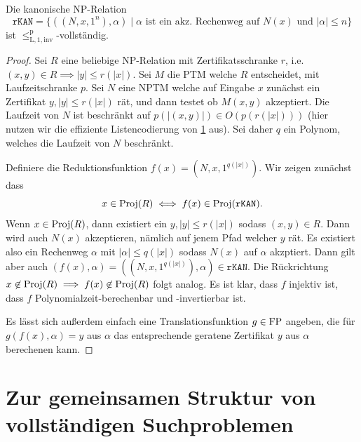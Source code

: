 \begin{theorem}
    Die kanonische NP-Relation
    \[ \mathtt{rKAN} = \{ ((N,x,1^n), \alpha) \mid \text{$\alpha$ ist ein akz. Rechenweg auf $N(x)$ und $|\alpha|\leq n$} \} \]
    ist $\leq_\mathrm{L,1,inv}^\mathrm p$-vollständig.
\end{theorem}
\begin{proof}
    Sei $R$ eine beliebige NP-Relation mit Zertifikatsschranke $r$, i.e. $(x,y)\in R\implies |y|\leq r(|x|)$. Sei $M$ die PTM welche $R$ entscheidet, mit Laufzeitschranke $p$. Sei $N$ eine NPTM welche auf Eingabe $x$ zunächst ein Zertifikat $y, |y|\leq r(|x|)$ rät, und dann testet ob $M(x,y)$ akzeptiert. Die Laufzeit von $N$ ist beschränkt auf $p(|(x,y)|)\in O(p(r(|x|)))$ (hier nutzen wir die effiziente Listencodierung von \ref{} aus). Sei daher $q$ ein Polynom, welches die Laufzeit von $N$ beschränkt.

    Definiere die Reduktionsfunktion $f(x)=(N, x, 1^{q(|x|)})$. Wir zeigen zunächst dass
    \[ x\in \operatorname{Proj}(R)\iff f(x)\in \operatorname{Proj}(\mathtt{rKAN}). \]
    Wenn $x\in\operatorname{Proj}(R)$, dann existiert ein $y, |y|\leq r(|x|)$ sodass $(x,y)\in R$. Dann wird auch $N(x)$ akzeptieren, nämlich auf jenem Pfad welcher $y$ rät. Es existiert also ein Rechenweg $\alpha$ mit $|\alpha|\leq q(|x|)$ sodass $N(x)$ auf $\alpha$ akzptiert. Dann gilt aber auch $(f(x), \alpha)=((N,x,1^{q(|x|)}),\alpha)\in \mathtt{rKAN}$.
    Die Rückrichtung $x\not\in \operatorname{Proj}(R)\implies f(x)\not\in\operatorname{Proj}(R)$ folgt analog.
    Es ist klar, dass $f$ injektiv ist, dass $f$ Polynomialzeit-berechenbar und -invertierbar ist. 

    Es lässt sich außerdem einfach eine Translationsfunktion $g\in \mathrm{FP}$ angeben, die für $g(f(x), \alpha)=y$ aus $\alpha$ das entsprechende geratene Zertifikat $y$ aus $\alpha$ berechenen kann.
\end{proof}

\section{Zur gemeinsamen Struktur von vollständigen Suchproblemen}





